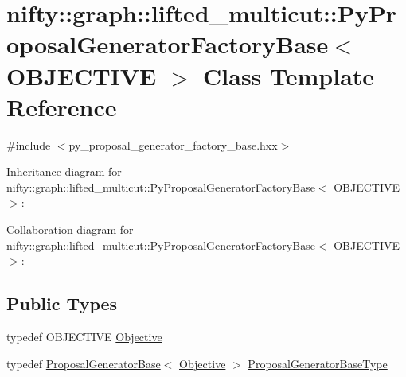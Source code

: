 \hypertarget{classnifty_1_1graph_1_1lifted__multicut_1_1PyProposalGeneratorFactoryBase}{}\section{nifty\+:\+:graph\+:\+:lifted\+\_\+multicut\+:\+:Py\+Proposal\+Generator\+Factory\+Base$<$ O\+B\+J\+E\+C\+T\+I\+V\+E $>$ Class Template Reference}
\label{classnifty_1_1graph_1_1lifted__multicut_1_1PyProposalGeneratorFactoryBase}


{\ttfamily \#include $<$py\+\_\+proposal\+\_\+generator\+\_\+factory\+\_\+base.\+hxx$>$}



Inheritance diagram for nifty\+:\+:graph\+:\+:lifted\+\_\+multicut\+:\+:Py\+Proposal\+Generator\+Factory\+Base$<$ O\+B\+J\+E\+C\+T\+I\+V\+E $>$\+:


Collaboration diagram for nifty\+:\+:graph\+:\+:lifted\+\_\+multicut\+:\+:Py\+Proposal\+Generator\+Factory\+Base$<$ O\+B\+J\+E\+C\+T\+I\+V\+E $>$\+:
\subsection*{Public Types}
\begin{DoxyCompactItemize}
\item 
typedef O\+B\+J\+E\+C\+T\+I\+V\+E \hyperlink{classnifty_1_1graph_1_1lifted__multicut_1_1PyProposalGeneratorFactoryBase_a17a243ad822d48f623cd9b22ccce0736}{Objective}
\item 
typedef \hyperlink{classnifty_1_1graph_1_1lifted__multicut_1_1ProposalGeneratorBase}{Proposal\+Generator\+Base}$<$ \hyperlink{classnifty_1_1graph_1_1lifted__multicut_1_1PyProposalGeneratorFactoryBase_a17a243ad822d48f623cd9b22ccce0736}{Objective} $>$ \hyperlink{classnifty_1_1graph_1_1lifted__multicut_1_1PyProposalGeneratorFactoryBase_af73e8b46f7e053e667e3c78e57b958b1}{Proposal\+Generator\+Base\+Type}
\end{DoxyCompactItemize}
